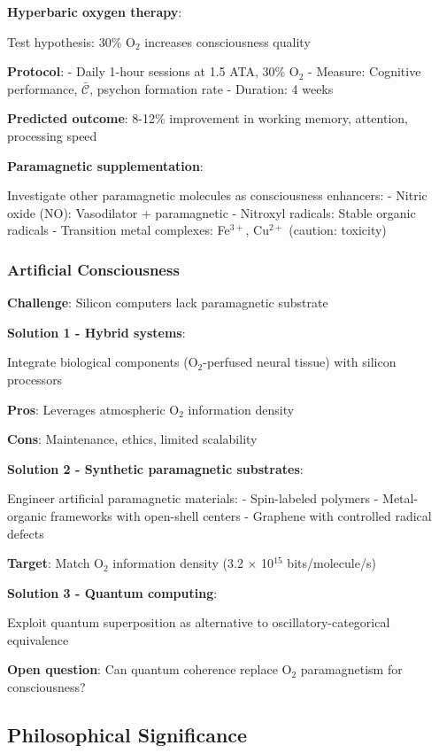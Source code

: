 \documentclass[11pt,onecolumn]{article}
\begin{document}
\textbf{Hyperbaric oxygen therapy}:

Test hypothesis: 30\% O$_2$ increases consciousness quality

\textbf{Protocol}:
- Daily 1-hour sessions at 1.5 ATA, 30\% O$_2$
- Measure: Cognitive performance, $\bar{\mathcal{C}}$, psychon formation rate
- Duration: 4 weeks

\textbf{Predicted outcome}: 8-12\% improvement in working memory, attention, processing speed

\textbf{Paramagnetic supplementation}:

Investigate other paramagnetic molecules as consciousness enhancers:
- Nitric oxide (NO): Vasodilator + paramagnetic
- Nitroxyl radicals: Stable organic radicals
- Transition metal complexes: Fe$^{3+}$, Cu$^{2+}$ (caution: toxicity)

\subsubsection{Artificial Consciousness}

\textbf{Challenge}: Silicon computers lack paramagnetic substrate

\textbf{Solution 1 - Hybrid systems}:

Integrate biological components (O$_2$-perfused neural tissue) with silicon processors

\textbf{Pros}: Leverages atmospheric O$_2$ information density

\textbf{Cons}: Maintenance, ethics, limited scalability

\textbf{Solution 2 - Synthetic paramagnetic substrates}:

Engineer artificial paramagnetic materials:
- Spin-labeled polymers
- Metal-organic frameworks with open-shell centers
- Graphene with controlled radical defects

\textbf{Target}: Match O$_2$ information density (3.2 × 10$^{15}$ bits/molecule/s)

\textbf{Solution 3 - Quantum computing}:

Exploit quantum superposition as alternative to oscillatory-categorical equivalence

\textbf{Open question}: Can quantum coherence replace O$_2$ paramagnetism for consciousness?

\subsection{Philosophical Significance}
\end{document}
